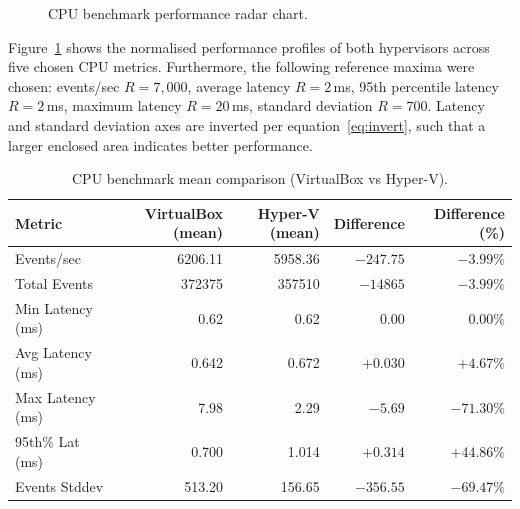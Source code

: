 \documentclass[a4paper, 12pt]{article}
\theoremstyle{plain}
\theoremstyle{definition}
\theoremstyle{remark}
\begin{document}
\begin{figure}[H]
    \caption{CPU benchmark performance radar chart.}
    \label{fig:cpu-radar}
    \end{figure}

    \noindent Figure~\ref{fig:cpu-radar} shows the normalised performance profiles of
    both hypervisors across five chosen CPU metrics. Furthermore, the following reference
    maxima were chosen: events/sec $R = 7{,}000$, average latency $R = 2$\,ms, 95th percentile
    latency $R = 2$\,ms, maximum latency $R = 20$\,ms, standard deviation $R = 700$.
    Latency and standard deviation axes are inverted per equation~\eqref{eq:invert},
    such that a larger enclosed area indicates better performance.

    \begin{table}[H]
    \centering
    \caption{CPU benchmark mean comparison (VirtualBox vs Hyper-V).}
    \label{tab:cpu-compare}
    \begin{tabular}{lrrrr}
    \hline
    \textbf{Metric} & \textbf{VirtualBox (mean)} & \textbf{Hyper-V (mean)} & \textbf{Difference} & \textbf{Difference (\%)} \\
    \hline
    Events/sec       & 6206.11      & 5958.36    & $-247.75$    & $-3.99\%$ \\
    Total Events     & 372375       & 357510     & $-14865$     & $-3.99\%$ \\
    Min Latency (ms) & 0.62         & 0.62       & $0.00$       & $0.00\%$  \\
    Avg Latency (ms) & 0.642        & 0.672      & $+0.030$     & $+4.67\%$ \\
    Max Latency (ms) & 7.98         & 2.29       & $-5.69$      & $-71.30\%$ \\
    95th\% Lat (ms)  & 0.700        & 1.014      & $+0.314$     & $+44.86\%$ \\
    Events Stddev    & 513.20       & 156.65     & $-356.55$    & $-69.47\%$ \\
    \hline
    \end{tabular}
    \end{table}
\end{document}

